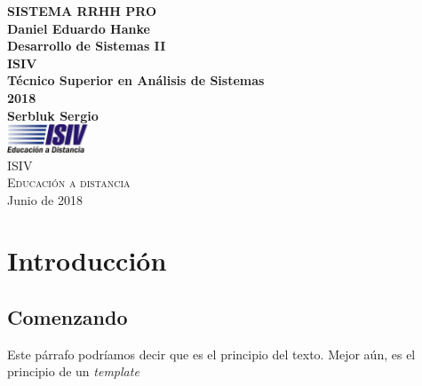 \documentclass{article}
\begin{document}
\begin{titlepage}

\begin{center}


\LARGE 	\textbf {SISTEMA RRHH PRO}\\[0.5in]
\Large 	\textbf {Daniel Eduardo Hanke}\\[0.5in]
\Large 	\textbf {Desarrollo de Sistemas II}\\[0.5in]
\Large 	\textbf {ISIV}\\[0.5in]
\Large 	\textbf {Técnico Superior en Análisis de Sistemas}\\[0.5in]
\Large 	\textbf {2018}\\[0.5in]
\Large 	\textbf {Serbluk Sergio}\\[1.8in]




%
%

\includegraphics[width=0.18\textwidth]{../../../common/images/logo_ISIV}\\[0.1in]
\Large{ISIV}\\
\normalsize
\textsc{Educación a distancia}\\
\vspace{0.2cm}
Junio de 2018

\end{center}

\end{titlepage}

\newpage
\tableofcontents
\newpage
\section{Introducción}
\subsection{Comenzando}
Este párrafo podríamos decir que es el principio del texto. Mejor aún, es el principio de un \emph{template}
\end{document}
